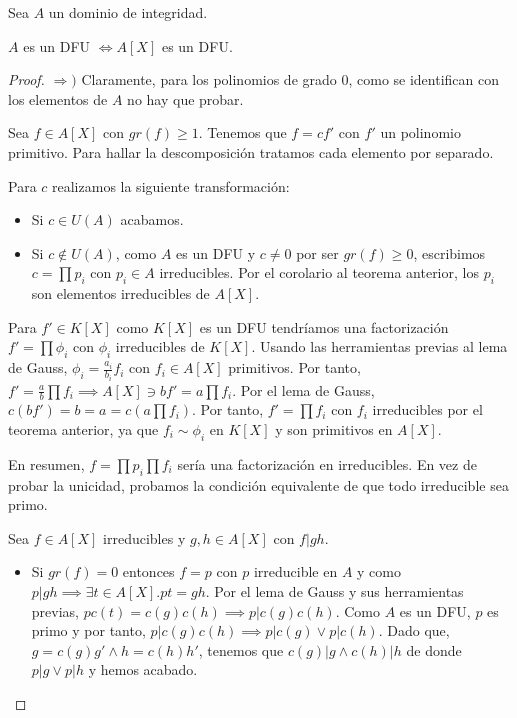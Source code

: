 \begin{theorem}
Sea $A$ un dominio de integridad. 

$A$ es un DFU $\iff A[X]$ es un DFU. 
\end{theorem}
\begin{proof}
$\Rightarrow)$ Claramente, para los polinomios de grado 0, como se identifican con los elementos de $A$ no hay que probar. 

Sea $f \in A[X]$ con $gr(f) \ge 1$. Tenemos que $f = cf'$ con $f'$ un polinomio primitivo. Para hallar la descomposición tratamos cada elemento por separado. 

Para $c$ realizamos la siguiente transformación:

\begin{itemize}
\item Si $c \in U(A)$ acabamos. 
\item Si $c \notin U(A)$, como $A$ es un DFU y $c \neq 0$ por ser $gr(f) \ge 0$, escribimos $c = \prod p_i$ con $p_i \in A$ irreducibles. Por el corolario al teorema anterior, los $p_i$ son elementos irreducibles de $A[X]$.
\end{itemize}

Para $f' \in K[X]$ como $K[X]$ es un DFU tendríamos una factorización $f' = \prod \phi_i$ con $\phi_i$ irreducibles de $K[X]$. Usando las herramientas previas al lema de Gauss, $\phi_i = \frac{a_i}{b_i} f_i$ con $f_i \in A[X]$ primitivos. Por tanto, $f' = \frac{a}{b} \prod f_i \implies A[X] \ni bf' = a \prod f_i$. Por el lema de Gauss, $c(bf') = b = a = c(a \prod f_i)$. Por tanto, $f' = \prod f_i$ con $f_i$ irreducibles por el teorema anterior, ya que $f_i \sim \phi_i$ en $K[X]$ y son primitivos en $A[X]$. 

En resumen, $f = \prod p_i \prod f_i$ sería una factorización en irreducibles. En vez de probar la unicidad, probamos la condición equivalente de que todo irreducible sea primo. 

Sea $f \in A[X]$ irreducibles y $g,h \in A[X]$ con $f|gh$. 

\begin{itemize}
\item Si $gr(f) = 0$ entonces $f = p$ con $p$ irreducible en $A$ y como $p|gh \implies \exists t \in A[X].pt = gh$. Por el lema de Gauss y sus herramientas previas, $pc(t) = c(g)c(h) \implies p|c(g)c(h)$. Como $A$ es un DFU, $p$ es primo y por tanto, $p|c(g)c(h) \implies p|c(g) \lor p|c(h)$. Dado que, $g = c(g)g' \land h = c(h)h'$, tenemos que $c(g) | g \land c(h) | h$ de donde $p|g \lor p|h$ y hemos acabado. 


\end{itemize}
\end{proof}
